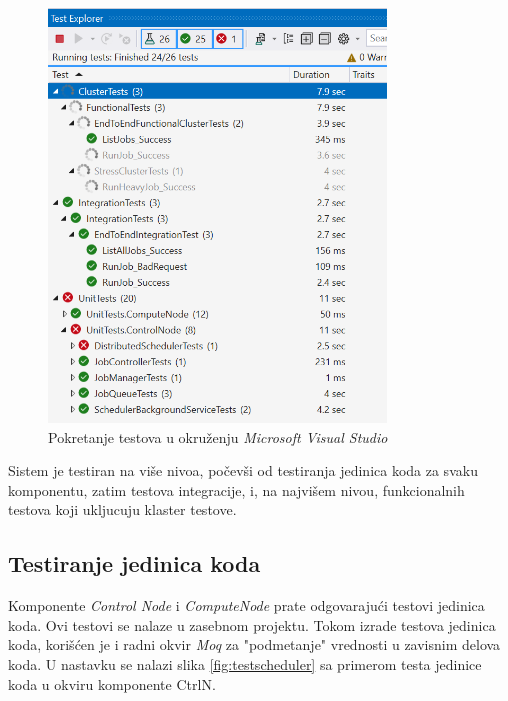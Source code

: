 \documentclass[12pt,oneside]{memoir}
\begin{document}
\begin{figure}[!ht]
  \centering
  \includegraphics[width=0.8\textwidth]{./images/testexplorer.png}
  \caption{Pokretanje testova u okruženju \emph{Microsoft Visual Studio}}
  \label{fig:testexplorer}
\end{figure}

Sistem je testiran na više nivoa, počevši od testiranja jedinica koda za svaku komponentu, zatim testova integracije, i, na najvišem nivou, funkcionalnih testova koji ukljucuju klaster testove.

\subsection{Testiranje jedinica koda}
Komponente \emph{Control Node} i \emph{ComputeNode} prate odgovarajući testovi jedinica koda. Ovi testovi se nalaze u zasebnom projektu. Tokom izrade testova jedinica koda, korišćen je i radni okvir \emph{Moq} \cite{Moq} za "podmetanje" vrednosti u zavisnim delova koda. U nastavku se nalazi slika \ref{fig:testscheduler} sa primerom testa jedinice koda u okviru komponente CtrlN.
\end{document}

